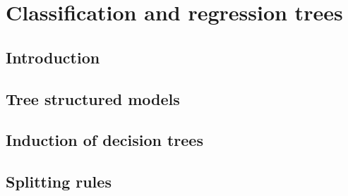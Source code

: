 \chapter{Classification and regression trees}\label{ch:cart}

\section{Introduction}


\section{Tree structured models}


\section{Induction of decision trees}


\section{Splitting rules}


